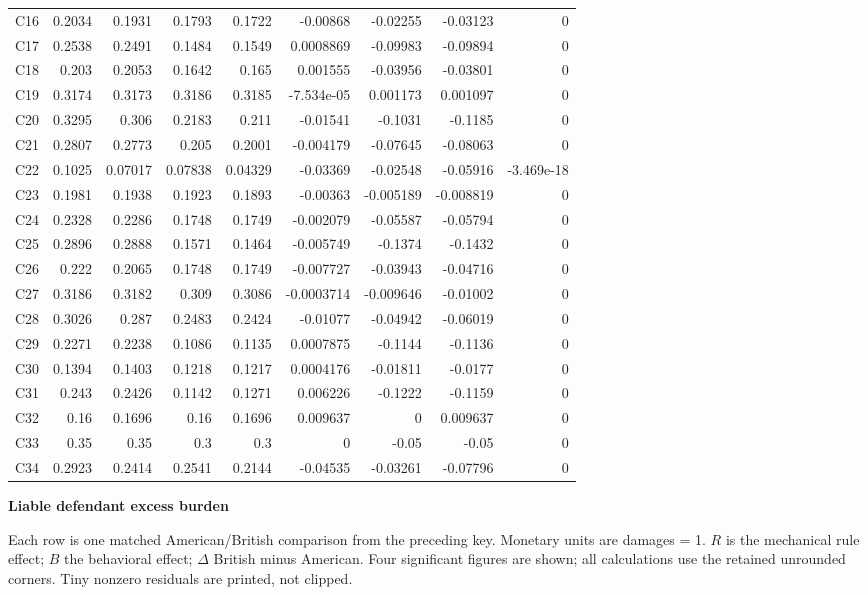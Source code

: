 \documentclass[10pt]{article}
\begin{document}
\begin{longtable}{@{}lrrrrrrrr@{}}
C16 & 0.2034 & 0.1931 & 0.1793 & 0.1722 & -0.00868 & -0.02255 & -0.03123 & 0\\[1pt]
C17 & 0.2538 & 0.2491 & 0.1484 & 0.1549 & 0.0008869 & -0.09983 & -0.09894 & 0\\[1pt]
C18 & 0.203 & 0.2053 & 0.1642 & 0.165 & 0.001555 & -0.03956 & -0.03801 & 0\\[1pt]
C19 & 0.3174 & 0.3173 & 0.3186 & 0.3185 & -7.534e-05 & 0.001173 & 0.001097 & 0\\[1pt]
C20 & 0.3295 & 0.306 & 0.2183 & 0.211 & -0.01541 & -0.1031 & -0.1185 & 0\\[1pt]
C21 & 0.2807 & 0.2773 & 0.205 & 0.2001 & -0.004179 & -0.07645 & -0.08063 & 0\\[1pt]
C22 & 0.1025 & 0.07017 & 0.07838 & 0.04329 & -0.03369 & -0.02548 & -0.05916 & -3.469e-18\\[1pt]
C23 & 0.1981 & 0.1938 & 0.1923 & 0.1893 & -0.00363 & -0.005189 & -0.008819 & 0\\[1pt]
C24 & 0.2328 & 0.2286 & 0.1748 & 0.1749 & -0.002079 & -0.05587 & -0.05794 & 0\\[1pt]
C25 & 0.2896 & 0.2888 & 0.1571 & 0.1464 & -0.005749 & -0.1374 & -0.1432 & 0\\[1pt]
C26 & 0.222 & 0.2065 & 0.1748 & 0.1749 & -0.007727 & -0.03943 & -0.04716 & 0\\[1pt]
C27 & 0.3186 & 0.3182 & 0.309 & 0.3086 & -0.0003714 & -0.009646 & -0.01002 & 0\\[1pt]
C28 & 0.3026 & 0.287 & 0.2483 & 0.2424 & -0.01077 & -0.04942 & -0.06019 & 0\\[1pt]
C29 & 0.2271 & 0.2238 & 0.1086 & 0.1135 & 0.0007875 & -0.1144 & -0.1136 & 0\\[1pt]
C30 & 0.1394 & 0.1403 & 0.1218 & 0.1217 & 0.0004176 & -0.01811 & -0.0177 & 0\\[1pt]
C31 & 0.243 & 0.2426 & 0.1142 & 0.1271 & 0.006226 & -0.1222 & -0.1159 & 0\\[1pt]
C32 & 0.16 & 0.1696 & 0.16 & 0.1696 & 0.009637 & 0 & 0.009637 & 0\\[1pt]
C33 & 0.35 & 0.35 & 0.3 & 0.3 & 0 & -0.05 & -0.05 & 0\\[1pt]
C34 & 0.2923 & 0.2414 & 0.2541 & 0.2144 & -0.04535 & -0.03261 & -0.07796 & 0\\[1pt]
\end{longtable}\normalsize
\newpage
{\LARGE\bfseries Liable defendant excess burden}\par\medskip
Each row is one matched American/British comparison from the preceding key. Monetary units are damages = 1. $R$ is the mechanical rule effect; $B$ the behavioral effect; $\Delta$ British minus American. Four significant figures are shown; all calculations use the retained unrounded corners. Tiny nonzero residuals are printed, not clipped.\par\medskip
\end{document}
